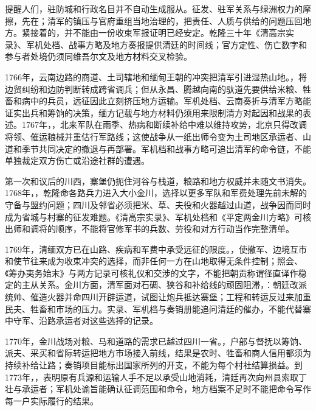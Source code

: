 提醒人们，驻防城和行政名目并不自动生成服从。征发、驻军关系与绿洲权力的摩擦，先在；清军的镇压与官府重组当地治理的，把责任、人质与供给的问题压回地方。紧接着的，并不能由一份收束军报证明已经安定。乾隆三十年《清高宗实录》、军机处档、战事方略及地方奏报提供清廷的时间线；官方定性、伤亡数字和参与者处境仍须同维吾尔文及地方材料交叉检验。

1766年，云南边路的商道、土司辖地和缅甸王朝的冲突把清军引进湿热山地。，将边贸纠纷和边防判断转成跨省调兵；但从永昌、腾越向南的驮道先要供给米粮、牲畜和病中的兵员，远征因此立刻挤压地方运输。军机处档、云南奏折与清军方略能证实出兵和筹饷的决策，缅方记载与地方材料仍须用来限制清方对起因和战果的表述。1767年，，北来军队在雨季、热病和断续补给中难以维持攻势，北京只得改调将领、催运粮械并重估行军路线；这使战争从一纸出师令变为土司地区承运者、山道和季节共同决定的撤退与再部署。军机档和战事方略可追出清军的命令链，不能单独裁定双方伤亡或沿途社群的遭遇。

第一次和议后的川西，寨堡仍扼住河谷与栈道，粮路和地方权威并未随文书消失。1768年，，乾隆命各路兵力进入大小金川，选择以更多军队和军费处理先前未解的守备与盟约问题；四川及邻省必须把米、草、夫役和火器越过山道，战争因而同时成为省城与村寨的征发难题。《清高宗实录》、军机处档和《平定两金川方略》可核出师和调将的顺序，不能将官修军书的兵数、劳役和对方行动当作完整清单。

1769年，清缅双方已在山路、疾病和军费中承受远征的限度。，使撤军、边境互市和使节往来成为收束冲突的选择，而非任何一方在山地取得无条件控制；照会、《筹办夷务始末》与两方记录可核礼仪和交涉的文字，不能把朝贡称谓径直译作稳定的主从关系。金川方面，清军面对石碉、狭谷和补给线的顽固阻滞，：朝廷改派统帅、催造火器并命四川开辟运道，试图让炮兵抵达寨堡；工程和转运反过来加重民夫、牲畜和市场的压力。实录、军机档与奏销册能追问清廷的催办，不能代替寨中守军、沿路承运者对这些选择的记录。

1770年，金川战场对粮、马和道路的需求已越过四川一省。，户部与督抚以筹饷、派夫、采买和省际转运把地方市场接入前线，结果是农时、牲畜和商人信用都须为持续补给让路；奏销项目能标出国家所列的开支，不能为每个村社结算损益。到1773年，，表明原有兵源和运输人手不足以承受山地消耗，清廷再次向州县索取丁壮与承运者；军机处谕旨能确认征调范围和命令，地方档案不足时不能把命令写作每一户实际履行的结果。

